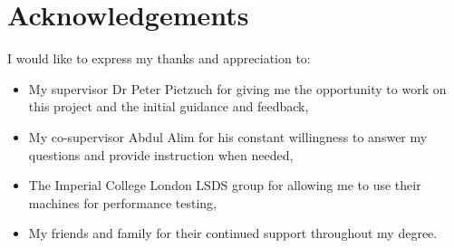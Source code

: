 \documentclass[final_report.tex]{subfiles}
\begin{document}
\section*{Acknowledgements}
\thispagestyle{empty}
I would like to express my thanks and appreciation to:

\begin{itemize}
	\item My supervisor Dr Peter Pietzuch for giving me the opportunity to work on this project and the initial guidance and feedback,
	\item My co-supervisor Abdul Alim for his constant willingness to answer my questions and provide instruction when needed,
	\item The Imperial College London LSDS group for allowing me to use their machines for performance testing,
	\item My friends and family for their continued support throughout my degree.
\end{itemize}

\clearpage
\end{document}
